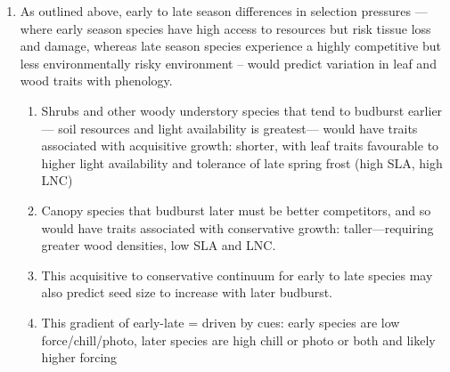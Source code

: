 \documentclass{article}
\begin{document}
\begin{enumerate}
\item As outlined above, early to late season differences in selection pressures --- where early season species have high access to resources but risk tissue loss and damage, whereas late season species experience a highly competitive but less environmentally risky environment -- would predict variation in leaf and wood traits with phenology. 
\begin{enumerate}
\item Shrubs and other woody understory species that tend to budburst earlier--- soil resources and light availability is greatest--- would have traits associated with acquisitive growth: shorter, with leaf traits favourable to higher light availability and tolerance of late spring frost (high SLA, high LNC)  %
\item Canopy species that budburst later must be better competitors, and so would have traits associated with conservative growth: taller---requiring greater wood densities, low SLA and LNC. %
\item This acquisitive to conservative continuum for early to late species may also predict seed size to increase with later budburst. 
\item This gradient of early-late = driven by cues: early species are low force/chill/photo, later species are high chill or photo or both and likely higher forcing %
\end{enumerate}






\end{enumerate}
\end{document}
